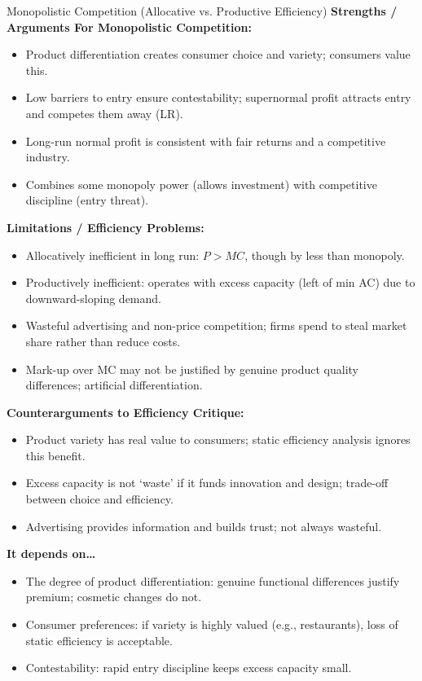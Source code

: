 \documentclass[11pt, a4paper, twoside]{book}
\begin{document}
\begin{evaluation}{Monopolistic Competition (Allocative vs. Productive Efficiency)}
\textbf{Strengths / Arguments For Monopolistic Competition:}
\begin{itemize}[leftmargin=*, nosep]
\item Product differentiation creates consumer choice and variety; consumers value this.
\item Low barriers to entry ensure contestability; supernormal profit attracts entry and competes them away (LR).
\item Long-run normal profit is consistent with fair returns and a competitive industry.
\item Combines some monopoly power (allows investment) with competitive discipline (entry threat).
\end{itemize}
\textbf{Limitations / Efficiency Problems:}
\begin{itemize}[leftmargin=*, nosep]
\item Allocatively inefficient in long run: $P > MC$, though by less than monopoly.
\item Productively inefficient: operates with excess capacity (left of min AC) due to downward-sloping demand.
\item Wasteful advertising and non-price competition; firms spend to steal market share rather than reduce costs.
\item Mark-up over MC may not be justified by genuine product quality differences; artificial differentiation.
\end{itemize}
\textbf{Counterarguments to Efficiency Critique:}
\begin{itemize}[leftmargin=*, nosep]
\item Product variety has real value to consumers; static efficiency analysis ignores this benefit.
\item Excess capacity is not `waste' if it funds innovation and design; trade-off between choice and efficiency.
\item Advertising provides information and builds trust; not always wasteful.
\end{itemize}
\textbf{It depends on\ldots}
\begin{itemize}[leftmargin=*, nosep]
\item The degree of product differentiation: genuine functional differences justify premium; cosmetic changes do not.
\item Consumer preferences: if variety is highly valued (e.g., restaurants), loss of static efficiency is acceptable.
\item Contestability: rapid entry discipline keeps excess capacity small.
\end{itemize}
\end{evaluation}
\end{document}
